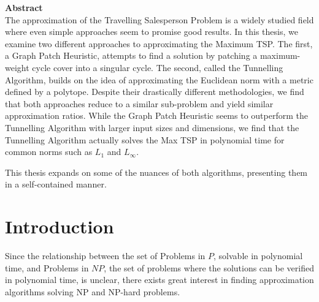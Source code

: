 \documentclass{article}
\begin{document}




\newpage


\vspace*{2cm}
\begin{center}
\begin{minipage}{0.7\textwidth}
{\large \hspace{2pt}\textbf{Abstract}\vspace{1pt}}\\

The approximation of the Travelling Salesperson Problem is a widely studied field
where even simple approaches seem to promise good results. In this thesis, we
examine two different approaches to approximating the Maximum TSP. The first, a
Graph Patch Heuristic, attempts to find a solution by patching a maximum-weight
cycle cover into a singular cycle. The second, called the Tunnelling Algorithm,
builds on the idea of approximating the Euclidean norm with a metric defined by
a polytope. Despite their drastically different methodologies, we find that both
approaches reduce to a similar sub-problem and yield similar approximation
ratios. While the Graph Patch Heuristic seems to outperform the Tunnelling
Algorithm with larger input sizes and dimensions, we find that the Tunnelling
Algorithm actually solves the Max TSP in polynomial time for common norms such
as $L_1$ and $L_\infty$.

This thesis expands on some of the nuances of both algorithms, presenting them
in a self-contained manner.

\end{minipage}
\end{center}

\newpage
{
\hypersetup{linkcolor=black}
\tableofcontents
}
\newpage





\section{Introduction}
\label{sec:intro}


Since the relationship between the set of Problems in $P$, solvable in
polynomial time, and Problems in $NP$, the set of problems where the solutions
can be verified in polynomial time, is unclear, there exists great interest in
finding approximation algorithms solving NP and NP-hard problems. 
\end{document}
